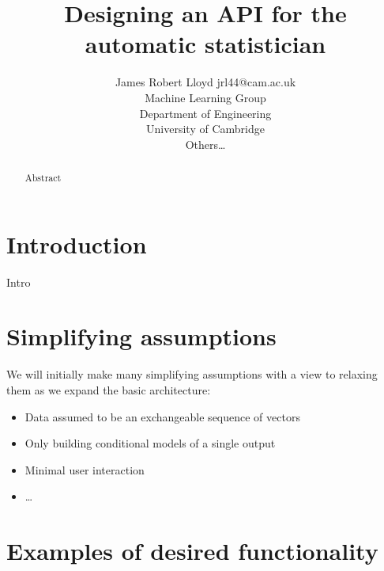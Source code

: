 \documentclass[twoside,11pt]{article}
\begin{document}
\lstset{language=Lisp,basicstyle=\ttfamily\footnotesize} 

\title{Designing an API for the automatic statistician}

\author{\name James Robert Lloyd \email jrl44@cam.ac.uk \\
       \addr 
       Machine Learning Group \\
       Department of Engineering\\
       University of Cambridge\\
       \AND
       \name Others\dots}


\maketitle

\begin{abstract}
Abstract
\end{abstract}


\section{Introduction}

Intro

\section{Simplifying assumptions}

We will initially make many simplifying assumptions with a view to relaxing them as we expand the basic architecture:

\begin{itemize}
  \item Data assumed to be an exchangeable sequence of vectors
  \item Only building conditional models of a single output
  \item Minimal user interaction
  \item \dots
\end{itemize}

\section{Examples of desired functionality}
\end{document}
